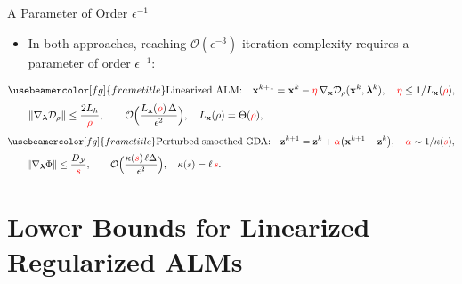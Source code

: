 \documentclass[10pt]{beamer}
\newcommand{\red}[1]{{\color[rgb]{1,0,0}{#1}}}
\newcommand{\blue}[1]{{\usebeamercolor[fg]{frametitle}#1}}
\newcommand{\bx}{\mathbf{x}}
\newcommand{\bz}{\mathbf{z}}
\newcommand{\blmbd}{\bm{\lambda}}
\newcommand{\calD}{\mathcal{D}}
\begin{document}
\begin{frame}{A Parameter of Order $\epsilon^{-1}$}
\small
\begin{itemize}
    \item In both approaches, reaching $\mathcal O(\epsilon^{-3})$ iteration complexity requires a parameter of order $\epsilon^{-1}$:
\end{itemize}
\[
\begin{aligned}
    &\blue{\text{Linearized ALM:}}\quad
    \bx^{k+1}=\bx^k-\red{\eta}\,\nabla_{\bx}\calD_\rho(\bx^k,\blmbd^k),\quad \red{\eta}\le 1/L_{\bx}(\red{\rho}),\\[2pt]
    &\qquad\|\nabla_{\blmbd}\calD_\rho\|\le\frac{2L_h}{\red{\rho}},\qquad
    \mathcal O\Bigl(\frac{L_{\bx}(\red{\rho})\,\Delta}{\epsilon^{2}}\Bigr),\quad L_{\bx}(\rho)=\Theta(\red{\rho}),
\end{aligned}
\]
\[
\begin{aligned}
    &\blue{\text{Perturbed smoothed GDA:}}\quad
    \bz^{k+1}=\bz^k+\red{\alpha}\bigl(\bx^{k+1}-\bz^k\bigr),\quad \red{\alpha}\sim 1/\kappa(\red{s}),\\[2pt]
    &\qquad\|\nabla_{\blmbd}\Phi\|\le\frac{D_{\mathcal Y}}{\red{s}},\qquad
    \mathcal O\Bigl(\frac{\kappa(\red{s})\,\ell\Delta}{\epsilon^{2}}\Bigr),\quad \kappa(s)=\ell\,\red{s}.
\end{aligned}
\]
\end{frame}

\section{Lower Bounds for Linearized Regularized ALMs}
\end{document}
